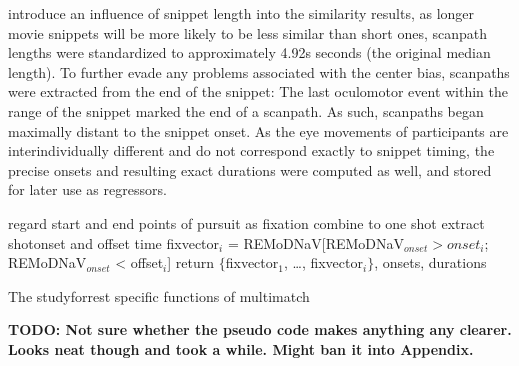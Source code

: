 \documentclass[a4paper, 12pt]{scrreprt}
\begin{document}
introduce an influence of snippet length into the similarity results, as longer movie snippets will be more likely to be less similar than short ones, scanpath lengths were standardized to approximately 4.92s seconds (the original median length). To further evade any problems associated with the center bias, scanpaths were extracted from the end of the snippet: The last oculomotor event within the range of the snippet marked the end of a scanpath. As such, scanpaths began maximally distant to the snippet onset.
As the eye movements of participants are interindividually different and do not correspond exactly to snippet timing, the precise onsets and resulting exact durations were computed as well, and stored for later use as regressors.

\begin{algorithm}[H]
	\begin{small}
		
		{
			{
				regard start and end points of pursuit as fixation
			}
		}
		{
		}
		{
			{combine to one shot}
		}
		{
			{extract shotonset and offset time}
		}
		{fixvector$_i$ = REMoDNaV[REMoDNaV$_{onset} > onset_i$; REMoDNaV$_{onset}$ < offset$_i$]
		}
		return $\{$fixvector$_1$, \ldots, fixvector$_i$$\}$, onsets, durations
		\caption{The studyforrest specific functions of multimatch}
		\label{algo:multimatch_forrest}
	\end{small}
\end{algorithm}
\textbf{TODO: Not sure whether the pseudo code makes anything any clearer. Looks neat though and took a while. Might ban it into Appendix.}
\end{document}
